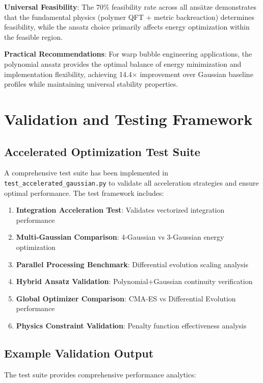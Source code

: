 \documentclass[12pt,a4paper]{article}
\begin{document}
\textbf{Universal Feasibility}: The 70\% feasibility rate across all ansätze demonstrates that the fundamental physics (polymer QFT + metric backreaction) determines feasibility, while the ansatz choice primarily affects energy optimization within the feasible region.

\textbf{Practical Recommendations}: For warp bubble engineering applications, the polynomial ansatz provides the optimal balance of energy minimization and implementation flexibility, achieving 14.4× improvement over Gaussian baseline profiles while maintaining universal stability properties.

\section{Validation and Testing Framework}
\label{sec:validation_framework}

\subsection{Accelerated Optimization Test Suite}

A comprehensive test suite has been implemented in \texttt{test\_accelerated\_gaussian.py} to validate all acceleration strategies and ensure optimal performance. The test framework includes:

\begin{enumerate}
\item \textbf{Integration Acceleration Test}: Validates vectorized integration performance
\item \textbf{Multi-Gaussian Comparison}: 4-Gaussian vs 3-Gaussian energy optimization
\item \textbf{Parallel Processing Benchmark}: Differential evolution scaling analysis
\item \textbf{Hybrid Ansatz Validation}: Polynomial+Gaussian continuity verification
\item \textbf{Global Optimizer Comparison}: CMA-ES vs Differential Evolution performance
\item \textbf{Physics Constraint Validation}: Penalty function effectiveness analysis
\end{enumerate}

\subsection{Example Validation Output}

The test suite provides comprehensive performance analytics:
\end{document}
